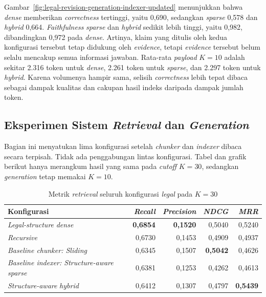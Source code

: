 Gambar~\ref{fig:legal-revision-generation-indexer-updated} menunjukkan bahwa \emph{dense}
memberikan \emph{correctness} tertinggi, yaitu 0,690, sedangkan \emph{sparse} 0,578 dan \emph{hybrid} 0,664.
\emph{Faithfulness} \emph{sparse} dan \emph{hybrid} sedikit lebih tinggi, yaitu 0,982, dibandingkan 0,972 pada
\emph{dense}. Artinya, klaim yang ditulis oleh kedua konfigurasi tersebut tetap didukung oleh \emph{evidence},
tetapi \emph{evidence} tersebut belum selalu mencakup semua informasi jawaban. Rata-rata \emph{payload} \(K = 10\)
adalah sekitar 2.316 token untuk \emph{dense}, 2.261 token untuk \emph{sparse}, dan 2.297 token untuk \emph{hybrid}.
Karena volumenya hampir sama, selisih \emph{correctness} lebih tepat dibaca sebagai dampak kualitas dan cakupan
hasil indeks daripada dampak jumlah token.

\subsection{Eksperimen Sistem \emph{Retrieval} dan \emph{Generation}}
\label{subsec:legal-revision-system-updated}
\label{subsec:legal-revision-system}

Bagian ini menyatukan lima konfigurasi setelah \emph{chunker} dan \emph{indexer} dibaca secara
terpisah. Tidak ada penggabungan lintas konfigurasi. Tabel dan grafik berikut hanya
merangkum hasil yang sama pada \emph{cutoff} \(K = 30\), sedangkan \emph{generation} tetap memakai
\(K = 10\).

\begin{table}[H]\centering\scriptsize
\caption{Metrik \emph{retrieval} seluruh konfigurasi \emph{legal} pada \(K = 30\)}
\label{tab:legal-revision-system-updated}
\begin{tabularx}{\textwidth}{@{}>{\RaggedRight\arraybackslash}p{4.5cm}rrrr@{}}
\toprule\textbf{Konfigurasi} & \textbf{\emph{Recall}} & \textbf{\emph{Precision}} & \textbf{\emph{NDCG}} & \textbf{\emph{MRR}}\\\midrule
\emph{Legal-structure} \emph{dense} & \textbf{0,6854} & \textbf{0,1520} & 0,5040 & 0,5240\\
\emph{Recursive} & 0,6730 & 0,1453 & 0,4909 & 0,4937\\
\emph{Baseline chunker: Sliding} & 0,6345 & 0,1507 & \textbf{0,5042} & 0,4626\\
\emph{Baseline indexer: Structure-aware sparse} & 0,6381 & 0,1253 & 0,4262 & 0,4613\\
\emph{Structure-aware} \emph{hybrid} & 0,6412 & 0,1307 & 0,4797 & \textbf{0,5439}\\
\bottomrule\end{tabularx}
\end{table}

